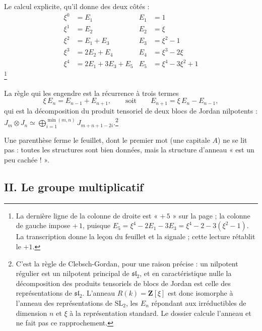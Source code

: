 \documentclass[11pt,a4paper]{article}
\begin{document}
Le calcul explicite, qu'il donne des deux côtés :
\begin{align*}
\xi^{0} &= E_{1}                      &  E_{1} &= 1 \\
\xi^{1} &= E_{2}                      &  E_{2} &= \xi \\
\xi^{2} &= E_{1} + E_{3}              &  E_{3} &= \xi^{2} - 1 \\
\xi^{3} &= 2E_{2} + E_{4}             &  E_{4} &= \xi^{3} - 2\xi \\
\xi^{4} &= 2E_{1} + 3E_{3} + E_{5}    &  E_{5} &= \xi^{4} - 3\xi^{2} + 1
\end{align*}
\footnote{La dernière ligne de la colonne de droite est « $+\,5$ » sur la
page ; la colonne de gauche impose $+\,1$, puisque $E_{5} = \xi^{4} - 2E_{1} -
3E_{3} = \xi^{4} - 2 - 3(\xi^{2}-1)$. La transcription donne la leçon du
feuillet et la signale ; cette lecture rétablit le $+1$.}

La règle qui les engendre est la récurrence à trois termes
\[
\xi\,E_{n} = E_{n-1} + E_{n+1} ,
\qquad\text{soit}\qquad
E_{n+1} = \xi\,E_{n} - E_{n-1} ,
\]
qui est la décomposition du produit tensoriel de deux blocs de Jordan
nilpotents : $J_{m} \otimes J_{n} \simeq \bigoplus_{i=1}^{\min(m,n)}
J_{m+n+1-2i}$.\footnote{C'est la règle de Clebsch-Gordan, pour une raison
précise : un nilpotent régulier est un nilpotent principal de
$\mathfrak{sl}_{2}$, et en caractéristique nulle la décomposition des produits
tensoriels de blocs de Jordan est celle des représentations de
$\mathfrak{sl}_{2}$. L'anneau $R(k) = \mathbf{Z}[\xi]$ est donc isomorphe à
l'anneau des représentations de $\mathrm{SL}_{2}$, les $E_{n}$ répondant aux
irréductibles de dimension $n$ et $\xi$ à la représentation standard. Le
dossier calcule l'anneau et ne fait pas ce rapprochement.}

Une parenthèse ferme le feuillet, dont le premier mot (une capitale $A$)
ne se lit pas : toutes les structures sont bien données, mais la structure
d'anneau « est un peu cachée ! ».

\subsection*{II. Le groupe multiplicatif}
\end{document}
